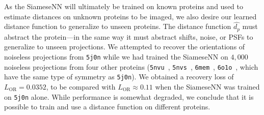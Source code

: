 As the SiameseNN will ultimately be trained on known proteins and used to estimate distances on unknown proteins to be imaged,
we also desire our learned distance function to generalize to unseen proteins.
The distance function $\widehat{d_p}$ must abstract the protein---in the same way it must abstract shifts, noise, or PSFs to generalize to unseen projections.
We attempted to recover the orientations of noiseless projections from \texttt{5j0n} while we had trained the SiameseNN on $4,000$ noiseless projections from four other proteins (\texttt{5nvu}~\cite{ZHANG20171303}, \texttt{5nvs}~\cite{ZHANG20171303}, \texttt{6mem}~\cite{iwai2018unique}, \texttt{6o1o}~\cite{liu2019target}, which have the same type of symmetry as \texttt{5j0n}).
We obtained a recovery loss of $L_\text{OR} = 0.0352$,
to be compared with $L_\text{OR} \approx 0.11$ when the SiameseNN was trained on \texttt{5j0n} alone.
While performance is somewhat degraded, we conclude that it is possible to train and use a distance function on different proteins.

